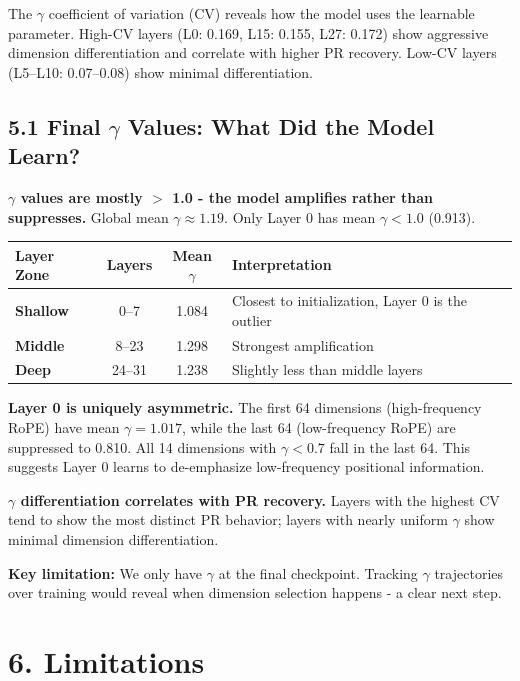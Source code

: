 \documentclass[11pt]{article}
\begin{document}
The $\gamma$ coefficient of variation (CV) reveals how the model uses the learnable parameter. High-CV layers (L0: 0.169, L15: 0.155, L27: 0.172) show aggressive dimension differentiation and correlate with higher PR recovery. Low-CV layers (L5--L10: 0.07--0.08) show minimal differentiation.

\subsection{5.1 Final $\gamma$ Values: What Did the Model Learn?}

\textbf{$\gamma$ values are mostly $>$ 1.0 - the model amplifies rather than suppresses.} Global mean $\gamma \approx 1.19$. Only Layer 0 has mean $\gamma < 1.0$ (0.913).

\begin{table}[h!]
\centering
\begin{tabular}{lccp{5cm}}
\toprule
\textbf{Layer Zone} & \textbf{Layers} & \textbf{Mean $\gamma$} & \textbf{Interpretation} \\
\midrule
\textbf{Shallow} & 0--7 & 1.084 & Closest to initialization, Layer 0 is the outlier \\
\textbf{Middle} & 8--23 & 1.298 & Strongest amplification \\
\textbf{Deep} & 24--31 & 1.238 & Slightly less than middle layers \\
\bottomrule
\end{tabular}
\end{table}

\textbf{Layer 0 is uniquely asymmetric.} The first 64 dimensions (high-frequency RoPE) have mean $\gamma = 1.017$, while the last 64 (low-frequency RoPE) are suppressed to 0.810. All 14 dimensions with $\gamma < 0.7$ fall in the last 64. This suggests Layer 0 learns to de-emphasize low-frequency positional information.

\textbf{$\gamma$ differentiation correlates with PR recovery.} Layers with the highest CV tend to show the most distinct PR behavior; layers with nearly uniform $\gamma$ show minimal dimension differentiation.

\textbf{Key limitation:} We only have $\gamma$ at the final checkpoint. Tracking $\gamma$ trajectories over training would reveal when dimension selection happens - a clear next step.

\section{6. Limitations}
\end{document}
